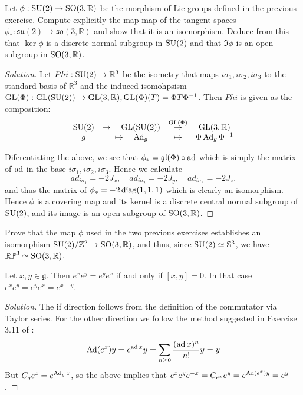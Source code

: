 \documentclass{report}
\begin{document}
\begin{exercise}[Exercise 2.9]
    Let $\phi: \operatorname{{\mathrm{SU}}}(2) \to \operatorname{{\mathrm{SO}}}(3, \mathbb R)$ be the morphism of Lie groups defined in the previous exercise.
    Compute explicitly the map map of the tangent spaces $\phi_*: \mathfrak{su}(2) \to \mathfrak{so}(3, \mathbb R)$ and show that it is an isomorphism.
    Deduce from this that $\ker \phi$ is a discrete normal subgroup in $\operatorname{{\mathrm{SU}}}(2)$ and that $\Im \phi$ is an open subgroup in $\operatorname{{\mathrm{SO}}}(3, \mathbb R)$.
\end{exercise}
\begin{proof}[Solution]
    Let $Phi: \operatorname{{\mathrm{SU}}}(2) \to \mathbb R^3$ be the isometry that maps $i\sigma_1, i \sigma_2, i\sigma_3$ to the standard basis of $\mathbb R^3$ and the induced isomohpsism $\operatorname{{\mathrm{GL}}}(\Phi): \operatorname{{\mathrm{GL}}}(\operatorname{{\mathrm{SU}}}(2)) \to \operatorname{{\mathrm{GL}}}(3, \mathbb R), \operatorname{{\mathrm{GL}}}(\Phi)(T) = \Phi T \Phi^{-1}$.
    Then $Phi$ is given as the composition:
    \[\begin{array}{ccccc}
        \operatorname{{\mathrm{SU}}}(2) &\to \quad \operatorname{{\mathrm{GL}}}(\operatorname{{\mathrm{SU}}}(2)) &\overset{\operatorname{{\mathrm{GL}}}(\Phi)}{\to} &\operatorname{{\mathrm{GL}}}(3, \mathbb R) \\
        g &\mapsto \quad \operatorname{Ad}_g &\mapsto &\Phi \operatorname{Ad}_g \Phi^{-1}
    \end{array}\]

    Diferentiating the above, we see that $\phi_* = \mathfrak{gl}(\Phi) \circ \operatorname{ad}$ which is simply the matrix of $\operatorname{ad}$ in the base $i\sigma_1, i\sigma_2, i\sigma_3$.
    Hence we calculate
    \[
    ad_{i\sigma_1} = - 2J_x, \quad
    ad_{i\sigma_2} = - 2J_y, \quad
    ad_{i\sigma_3} = - 2J_z.
    \]
    and thus the matrix of $\phi_* = -2 \operatorname{diag}(1,1,1)$ which is clearly an isomorphism.
    Hence $\phi$ is a covering map and its kernel is a discrete central normal subgroup of $\operatorname{{\mathrm{SU}}}(2)$, and its image is an open subgroup of $\operatorname{{\mathrm{SO}}}(3, \mathbb R)$.
\end{proof}

\begin{exercise}
    Prove that the map $\phi$ used in the two previous exercises establishes an isomorphism $\operatorname{{\mathrm{SU}}}(2)/\mathbb Z^2 \to \operatorname{{\mathrm{SO}}}(3, \mathbb R)$, and thus, since $\operatorname{{\mathrm{SU}}}(2)\simeq \mathbb S^3$, we have $\mathbb{RP}^3 \simeq \operatorname{{\mathrm{SO}}}(3, \mathbb R)$.
\end{exercise}
\begin{exercise}[Exercise 3.12]
        Let $x, y \in \mathfrak g$.
        Then $e^x e^y = e^y e^x$ if and only if $[x,y]=0$.
        In that case $e^x e^y = e^y e^x = e^{x+y}$.    
\end{exercise}
\begin{proof}[Solution]
    The if direction follows from the definition of the commutator via Taylor series.
    For the other direction we follow the method suggested in Exercise 3.11 of \cite{kirillov2008introduction}:
    \[
    \operatorname{Ad}(e^x)y = e^{\operatorname{ad} x} y = \sum_{n\geq 0} \frac{(\operatorname{ad} x)^n}{n!} y = y
    \]
    But $C_g e^z = e^{\operatorname{Ad}_g z}$, so the above implies that $e^x e^y e^{-x} = C_{e^x}e^y = e^{\operatorname{Ad}(e^x)y} = e^y$.
\end{proof}
\end{document}
